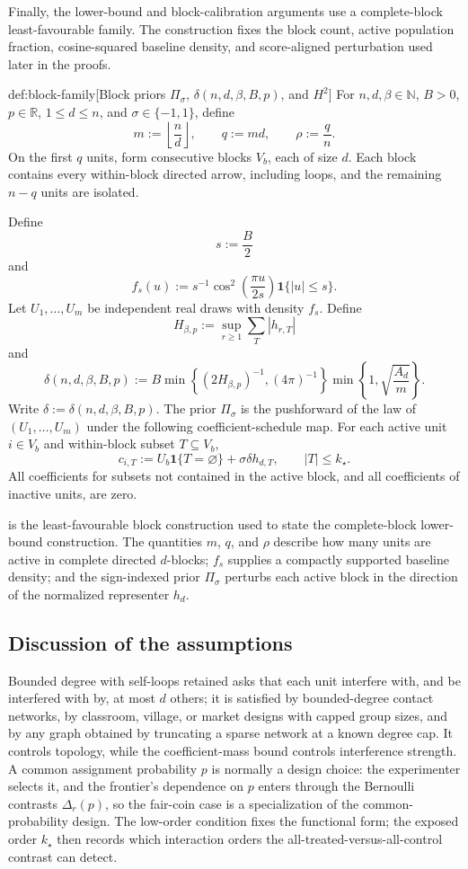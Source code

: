 \documentclass[11pt]{article}
\begin{document}
Finally, the lower-bound and block-calibration arguments use a complete-block least-favourable family. The construction fixes the block count, active population fraction, cosine-squared baseline density, and score-aligned perturbation used later in the proofs.

\begin{definitionv}{def:block-family}[Block priors \(\Pi_\sigma\), \(\delta(n,d,\beta,B,p)\), and \(H^2\)]
For \(n,d,\beta\in\mathbb N\), \(B>0\), \(p\in\mathbb R\), \(1\le d\le n\), and \(\sigma\in\{-1,1\}\), define
\[
m:=\left\lfloor \frac nd\right\rfloor,
\qquad
q:=md,
\qquad
\rho:=\frac qn .
\]
On the first \(q\) units, form consecutive blocks \(V_b\), each of size \(d\). Each block contains every within-block directed arrow, including loops, and the remaining \(n-q\) units are isolated.

Define
\[
s:=\frac B2
\]
and
\[
f_s(u):=
s^{-1}\cos^2\left(\frac{\pi u}{2s}\right)\mathbf 1\{|u|\le s\}.
\]
Let \(U_1,\ldots,U_m\) be independent real draws with density \(f_s\). Define
\[
H_{\beta,p}:=
\sup_{r\ge 1}\sum_T |h_{r,T}|
\]
and
\[
\delta(n,d,\beta,B,p)
:=
B\min\left\{(2H_{\beta,p})^{-1},(4\pi)^{-1}\right\}
\min\left\{1,\sqrt{\frac{A_d}{m}}\right\}.
\]
Write \(\delta:=\delta(n,d,\beta,B,p)\). The prior \(\Pi_\sigma\) is the pushforward of the law of \((U_1,\ldots,U_m)\) under the following coefficient-schedule map. For each active unit \(i\in V_b\) and within-block subset \(T\subseteq V_b\),
\[
c_{i,T}
:=
U_b\mathbf 1\{T=\varnothing\}
+\sigma\delta h_{d,T},
\qquad |T|\le k_\star .
\]
All coefficients for subsets not contained in the active block, and all coefficients of inactive units, are zero.
\end{definitionv}

 is the least-favourable block construction used to state the complete-block lower-bound construction. The quantities \(m\), \(q\), and \(\rho\) describe how many units are active in complete directed \(d\)-blocks; \(f_s\) supplies a compactly supported baseline density; and the sign-indexed prior \(\Pi_\sigma\) perturbs each active block in the direction of the normalized representer \(h_d\).

\subsection{Discussion of the assumptions}

Bounded degree with self-loops retained asks that each unit interfere with, and be interfered
with by, at most \(d\) others; it is satisfied by bounded-degree contact networks, by
classroom, village, or market designs with capped group sizes, and by any graph obtained by
truncating a sparse network at a known degree cap. It controls topology, while the
coefficient-mass bound controls interference strength. A common assignment probability
\(p\) is normally a design choice: the experimenter selects it, and the frontier's
dependence on \(p\) enters through the Bernoulli contrasts \(\Delta_r(p)\), so the fair-coin
case is a specialization of the common-probability design. The low-order condition fixes
the functional form; the exposed order \(k_\star\) then records which interaction orders the
all-treated-versus-all-control contrast can detect.
\end{document}
